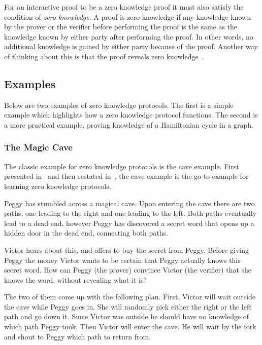 \documentclass{sig-alternate}
\begin{document}
	For an interactive proof to be a zero knowledge proof it must also
	satisfy the condition of \textit{zero knowledge}.	
	A proof is zero knowledge if any knowledge known by
	the prover or the verifier before performing the proof is the same
	as the knowledge known by either party after performing the proof.			
	In other words, no additional knowledge is gained by either party because
	of the proof. Another way of thinking about this is that the proof reveals 	
	zero knowledge~\cite{Survey}.

	\subsection{Examples}
	
	Below are two examples of zero knowledge protocols. The
	first is a simple example which highlights how a zero knowledge
	protocol functions. The second is a more practical example,
	proving knowledge of a Hamiltonian cycle in a graph.
	
	\subsubsection{The Magic Cave}
	The classic example for zero knowledge protocols is the cave example.
	First presented in~\cite{Children:1987} and then restated
	in~\cite{Survey}, the cave example is the go-to example for learning
	zero knowledge protocols.

	Peggy has stumbled across a magical cave. Upon entering the cave
	there are two paths, one leading to the right and one leading to the
	left. Both paths eventually lead to a dead end, however Peggy has
	discovered a secret word that opens up a hidden door in the dead end,
	connecting both paths.

	Victor hears about this, and offers to buy the secret from Peggy.
	Before giving Peggy the money Victor
	wants to be certain that Peggy actually knows this secret word. How can
	Peggy (the prover) convince Victor (the verifier) that she knows the
	word, without revealing what it is?

	The two of them come up with the following plan. First, Victor will wait
	outside the cave while Peggy goes in. She will randomly pick either the
	right or the left path and go down it. Since Victor was outside he
	should have no knowledge of which path Peggy took. Then Victor will
	enter the cave. He will wait by the fork and shout to Peggy which
	path to return from. 
	
\end{document}
